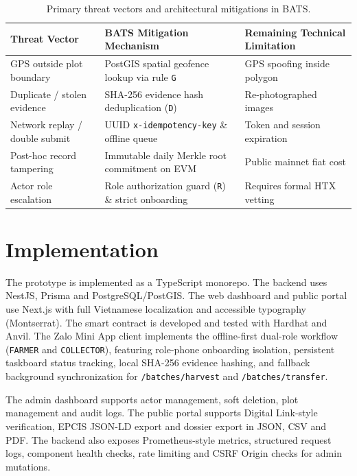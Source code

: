 \documentclass[runningheads]{llncs}
\begin{document}
\begin{table}[H]
\centering
\caption{Primary threat vectors and architectural mitigations in BATS.}
\label{tab:threats}
\begin{tabularx}{\textwidth}{@{}lXl@{}}
\toprule
\textbf{Threat Vector} & \textbf{BATS Mitigation Mechanism} & \textbf{Remaining Technical Limitation} \\ \midrule
GPS outside plot boundary & PostGIS spatial geofence lookup via rule \texttt{G} & GPS spoofing inside polygon \\ \addlinespace
Duplicate / stolen evidence & SHA-256 evidence hash deduplication (\texttt{D}) & Re-photographed images \\ \addlinespace
Network replay / double submit & UUID \texttt{x-idempotency-key} \& offline queue & Token and session expiration \\ \addlinespace
Post-hoc record tampering & Immutable daily Merkle root commitment on EVM & Public mainnet fiat cost \\ \addlinespace
Actor role escalation & Role authorization guard (\texttt{R}) \& strict onboarding & Requires formal HTX vetting \\ \bottomrule
\end{tabularx}
\end{table}

\section{Implementation}

The prototype is implemented as a TypeScript monorepo. The backend uses NestJS, Prisma and PostgreSQL/PostGIS. The web dashboard and public portal use Next.js with full Vietnamese localization and accessible typography (Montserrat). The smart contract is developed and tested with Hardhat and Anvil. The Zalo Mini App client implements the offline-first dual-role workflow (\texttt{FARMER} and \texttt{COLLECTOR}), featuring role-phone onboarding isolation, persistent taskboard status tracking, local SHA-256 evidence hashing, and fallback background synchronization for \texttt{/batches/harvest} and \texttt{/batches/transfer}.

The admin dashboard supports actor management, soft deletion, plot management and audit logs. The public portal supports Digital Link-style verification, EPCIS JSON-LD export and dossier export in JSON, CSV and PDF. The backend also exposes Prometheus-style metrics, structured request logs, component health checks, rate limiting and CSRF Origin checks for admin mutations.
\end{document}
